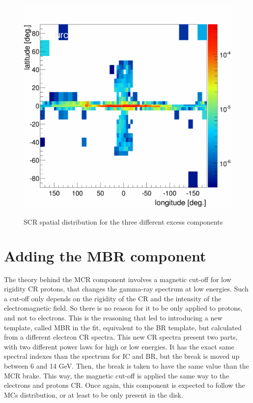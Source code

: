 \begin{figure}[h]
\begin{minipage}[h]{0.3\textwidth}
	  \label{}
  \end{minipage}
  \hfill
  \begin{minipage}[h]{0.3\textwidth}
	  \centering
	  \includegraphics[width=1.\linewidth]{pic/discussion/MSPonly_SCR_integral_flux.png}
	  \label{}
  \end{minipage}
  \caption{SCR spatial distribution for the three different excess components}
  \label{fig:SCR_flux_distrib_excess_comp}	 
\end{figure}


\section{Adding the MBR component}
The theory behind the MCR component involves a magnetic cut-off for low rigidity CR protons, that changes the gamma-ray spectrum at low energies. Such a cut-off only depends on the rigidity of the CR and the intensity of the electromagnetic field. So there is no reason for it to be only applied to protons, and not to electrons. This is the reasoning that led to introducing a new template, called MBR in the fit, equivalent to the BR template, but calculated from a different electron CR spectra. This new CR spectra present two parts, with two different power laws for high or low energies. It has the exact same spectral indexes than the spectrum for IC and BR, but the break is moved up between 6 and 14 GeV. Then, the break is taken to have the same value than the MCR brake. This way, the magnetic cut-off is applied the same way to the electrons and protons CR. Once again, this component is expected to follow the MCs distribution, or at least to be only present in the disk.

